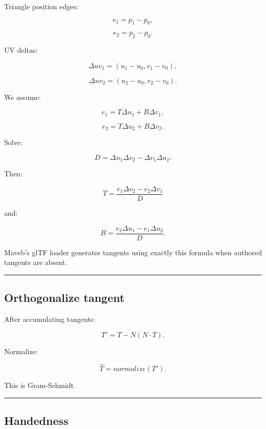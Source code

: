\hypertarget{04-visual-computing-ii-ch041-tangent-generation}{}

Triangle position edges:

\[
e_1=p_1-p_0,
\]

\[
e_2=p_2-p_0.
\]

UV deltas:

\[
\Delta uv_1=
(u_1-u_0,v_1-v_0),
\]

\[
\Delta uv_2=
(u_2-u_0,v_2-v_0).
\]

We assume:

\[
e_1=
T\Delta u_1+
B\Delta v_1,
\]

\[
e_2=
T\Delta u_2+
B\Delta v_2.
\]

Solve:

\[
D=
\Delta u_1\Delta v_2
-
\Delta v_1\Delta u_2.
\]

Then:

\[
\boxed{
T=
\frac{
e_1\Delta v_2-
e_2\Delta v_1
}{D}
}
\]

and:

\[
\boxed{
B=
\frac{
e_2\Delta u_1-
e_1\Delta u_2
}{D}.
}
\]

Maveb's glTF loader generates tangents using exactly this formula when authored tangents are absent.

\begin{center}\rule{0.5\linewidth}{0.5pt}\end{center}

\subsection{Orthogonalize tangent}\label{04-visual-computing-ii-ch041-orthogonalize-tangent}

\hypertarget{04-visual-computing-ii-ch041-orthogonalize-tangent}{}

After accumulating tangents:

\[
T'
=
T-N(N\cdot T).
\]

Normalize:

\[
\boxed{
\hat T=
normalize(T').
}
\]

This is Gram-Schmidt.

\begin{center}\rule{0.5\linewidth}{0.5pt}\end{center}

\subsection{Handedness}\label{04-visual-computing-ii-ch041-handedness}

